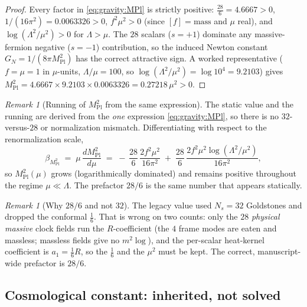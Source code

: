 \documentclass[11pt]{article}
\theoremstyle{plain}
\theoremstyle{definition}
\theoremstyle{remark}
\newtheorem{remark}[theorem]{Remark}
\begin{document}
\begin{proof}
Every factor in \eqref{eq:gravity:MPl} is strictly positive:
$\tfrac{28}{6}=4.6667>0$, $1/(16\pi^{2})=0.0063326>0$, $f^{2}\mu^{2}>0$
(since $[f]=\text{mass}$ and $\mu$ real), and
$\log(\Lambda^{2}/\mu^{2})>0$ for $\Lambda>\mu$. The $28$ scalars
($s=+1$) dominate any massive-fermion negative ($s=-1$) contribution, so the
induced Newton constant $G_{N}=1/(8\pi M_{\mathrm{Pl}}^{2})$ has the correct
attractive sign. A worked representative ($f=\mu=1$ in $\mu$-units,
$\Lambda/\mu=100$, so $\log(\Lambda^{2}/\mu^{2})=\log 10^{4}=9.2103$) gives
$M_{\mathrm{Pl}}^{2}=4.6667\times 9.2103\times 0.0063326=0.27218\,\mu^{2}>0$.
\end{proof}

\begin{remark}[Running of $M_{\mathrm{Pl}}^{2}$ from the same expression]
\label{rmk:gravity:running}
The static value and the running are derived from the \emph{one}
expression \eqref{eq:gravity:MPl}, so there is no $32$-versus-$28$ or
normalization mismatch. Differentiating with respect to the renormalization
scale,
\begin{equation}\label{eq:gravity:betaMPl}
  \beta_{M_{\mathrm{Pl}}^{2}}
  \;=\;
  \mu\,\frac{d M_{\mathrm{Pl}}^{2}}{d\mu}
  \;=\;
  -\,\frac{28}{6}\,\frac{2 f^{2}\mu^{2}}{16\pi^{2}}
  \;+\;\frac{28}{6}\,\frac{2 f^{2}\mu^{2}\log(\Lambda^{2}/\mu^{2})}{16\pi^{2}},
\end{equation}
so $M_{\mathrm{Pl}}^{2}(\mu)$ grows (logarithmically dominated) and remains
positive throughout the regime $\mu\ll\Lambda$. The prefactor $28/6$ is the
same number that appears statically.
\end{remark}

\begin{remark}[Why $28/6$ and not $32$]
\label{rmk:gravity:2832}
The legacy value used $N_{s}=32$ Goldstones and dropped the conformal
$\tfrac16$. That is wrong on two counts: only the $28$ \emph{physical
massive} clock fields run the $R$-coefficient (the $4$ frame modes are eaten
and massless; massless fields give no $m^{2}\log$), and the per-scalar
heat-kernel coefficient is $a_{1}=\tfrac16 R$, so the $\tfrac16$ and the
$\mu^{2}$ must be kept. The correct, manuscript-wide prefactor is
$28/6$.
\end{remark}

\subsection{Cosmological constant: inherited, not solved}
\label{sec:gravity:cc}
\end{document}
